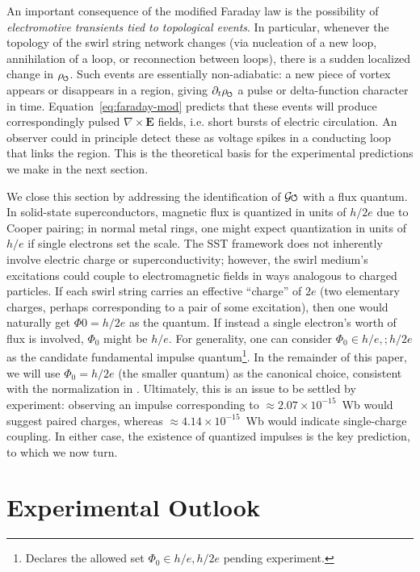 \documentclass[12pt]{article}
\DeclareRobustCommand{\swirlarrow}{
\mathchoice{\mkern-2mu\scriptstyle\boldsymbol{\circlearrowleft}}%
{\mkern-2mu\scriptstyle\boldsymbol{\circlearrowleft}}%
{\mkern-2mu\scriptscriptstyle\boldsymbol{\circlearrowleft}}%
{\mkern-2mu\scriptscriptstyle\boldsymbol{\circlearrowleft}}
}%
\newcommand{\Gswirl}{\mathcal{G}\swirlarrow}
\begin{document}
An important consequence of the modified Faraday law is the possibility of \emph{electromotive transients tied to topological events}. In particular, whenever the topology of the swirl string network changes (via nucleation of a new loop, annihilation of a loop, or reconnection between loops), there is a sudden localized change in $\rho_{\swirlarrow}$. Such events are essentially non-adiabatic: a new piece of vortex appears or disappears in a region, giving $\partial_t \rho_{\swirlarrow}$ a pulse or delta-function character in time. Equation~\eqref{eq:faraday-mod} predicts that these events will produce correspondingly pulsed $\nabla \times \mathbf{E}$ fields, i.e. short bursts of electric circulation. An observer could in principle detect these as voltage spikes in a conducting loop that links the region. This is the theoretical basis for the experimental predictions we make in the next section.


We close this section by addressing the identification of $\Gswirl$ with a flux quantum. In solid-state superconductors, magnetic flux is quantized in units of $h/2e$ due to Cooper pairing; in normal metal rings, one might expect quantization in units of $h/e$ if single electrons set the scale. The SST framework does not inherently involve electric charge or superconductivity; however, the swirl medium's excitations could couple to electromagnetic fields in ways analogous to charged particles. If each swirl string carries an effective ``charge'' of $2e$ (two elementary charges, perhaps corresponding to a pair of some excitation), then one would naturally get $\Phi{0}=h/2e$ as the quantum. If instead a single electron's worth of flux is involved, $\Phi_{0}$ might be $h/e$. For generality, one can consider $\Phi_{0}\in{h/e,;h/2e}$ as the candidate fundamental impulse quantum\footnote{Declares the allowed set $\Phi_0\in{h/e,h/2e}$ pending experiment.}. In the remainder of this paper, we will use $\Phi_{0}=h/2e$ (the smaller quantum) as the canonical choice, consistent with the normalization in \cite{Iskandarani2025RotatingFrame}. Ultimately, this is an issue to be settled by experiment: observing an impulse corresponding to $\approx2.07\times10^{-15}$~Wb would suggest paired charges, whereas $\approx4.14\times10^{-15}$~Wb would indicate single-charge coupling. In either case, the existence of quantized impulses is the key prediction, to which we now turn.


\section{Experimental Outlook}\label{sec:experimental}
\end{document}
